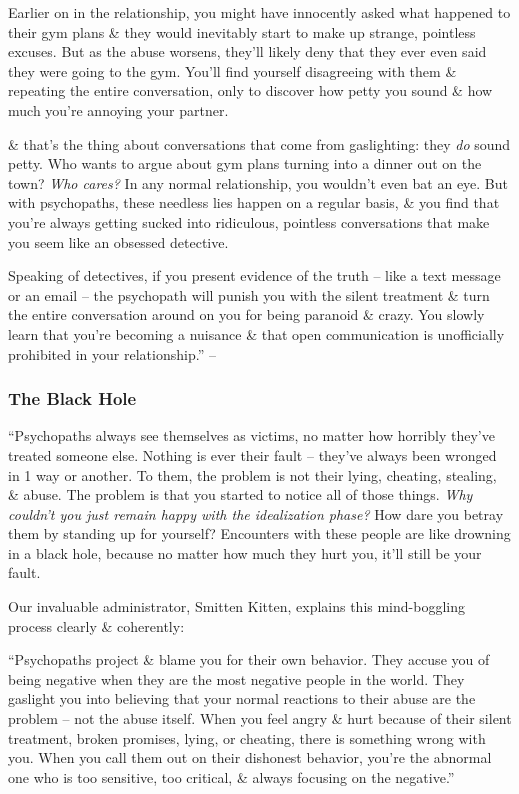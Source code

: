 \documentclass{article}
\numberwithin{equation}{section}
\begin{document}
Earlier on in the relationship, you might have innocently asked what happened to their gym plans \& they would inevitably start to make up strange, pointless excuses. But as the abuse worsens, they'll likely deny that they ever even said they were going to the gym. You'll find yourself disagreeing with them \& repeating the entire conversation, only to discover how petty you sound \& how much you're annoying your partner.

\& that's the thing about conversations that come from gaslighting: they \textit{do} sound petty. Who wants to argue about gym plans turning into a dinner out on the town? \textit{Who cares?} In any normal relationship, you wouldn't even bat an eye. But with psychopaths, these needless lies happen on a regular basis, \& you find that you're always getting sucked into ridiculous, pointless conversations that make you seem like an obsessed detective.

Speaking of detectives, if you present evidence of the truth -- like a text message or an email -- the psychopath will punish you with the silent treatment \& turn the entire conversation around on you for being paranoid \& crazy. You slowly learn that you're becoming a nuisance \& that open communication is unofficially prohibited in your relationship.'' -- \cite[pp. 46--47]{MacKenzie2015}

\subsubsection{The Black Hole}
``Psychopaths always see themselves as victims, no matter how horribly they've treated someone else. Nothing is ever their fault -- they've always been wronged in 1 way or another. To them, the problem is not their lying, cheating, stealing, \& abuse. The problem is that you started to notice all of those things. \textit{Why couldn't you just remain happy with the idealization phase?} How dare you betray them by standing up for yourself? Encounters with these people are like drowning in a black hole, because no matter how much they hurt you, it'll still be your fault.

Our invaluable administrator, Smitten Kitten, explains this mind-boggling process clearly \& coherently:

``Psychopaths project \& blame you for their own behavior. They accuse you of being negative when they are the most negative people in the world. They gaslight you into believing that your normal reactions to their abuse are the problem -- not the abuse itself. When you feel angry \& hurt because of their silent treatment, broken promises, lying, or cheating, there is something wrong with you. When you call them out on their dishonest behavior, you're the abnormal one who is too sensitive, too critical, \& always focusing on the negative.''
\end{document}

